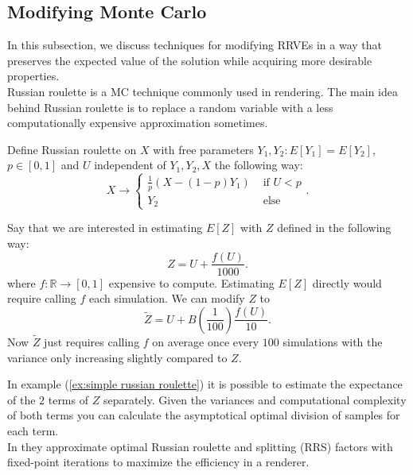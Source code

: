 \documentclass[a4paper,12pt]{article}
\begin{document}
\subsection{Modifying Monte Carlo}
In this subsection, we discuss techniques for modifying RRVEs
in a way that preserves the expected value of the solution while
acquiring more desirable properties. \\

Russian roulette is a MC technique commonly used in rendering.
The main idea behind Russian roulette is to replace a random variable
with a less computationally expensive approximation sometimes.

\begin{definition} \label{Russian roulette}
    Define Russian roulette on $X$ with free parameters
    $Y_{1},Y_{2}: E[Y_{1}] = E[Y_{2}]$, $p \in [0,1]$ and $U$
    independent of $Y_{1},Y_{2},X$ the following way:
    \begin{equation}
        X \rightarrow \begin{cases}
            \frac{1}{p}(X- (1-p)Y_{1}) & \text{ if } U<p \\
            Y_{2}                      & \text{ else }
        \end{cases}.
    \end{equation}
\end{definition}

\begin{example} \label{ex:simple russian roulette}
    Say that we are interested in estimating $E[Z]$ with $Z$
    defined in the following way:
    \begin{equation}
        Z = U + \frac{f(U)}{1000}.
    \end{equation}
    where $f:\mathbb{R} \rightarrow [0,1]$ expensive to compute.
    Estimating $E[Z]$ directly would require calling $f$ each
    simulation. We can modify $Z$ to
    \begin{equation}
        \tilde{Z} = U + B\left(\frac{1}{100}\right)\frac{f(U)}{10}.
    \end{equation}
    Now $\tilde{Z}$
    just requires calling $f$ on average once every $100$ simulations with the variance
    only increasing slightly compared to $Z$. \\

\end{example}

\begin{related}
    In example (\ref{ex:simple russian roulette}) it is possible to estimate
    the expectance of the $2$ terms of $Z$ separately. Given the variances and
    computational complexity  of both terms you can calculate the asymptotical optimal
    division of samples for each term. \\
    In \cite{rath_ears_2022} they approximate optimal Russian roulette and splitting
    (RRS) factors with fixed-point iterations to maximize the efficiency in a renderer.
\end{related}
\end{document}

